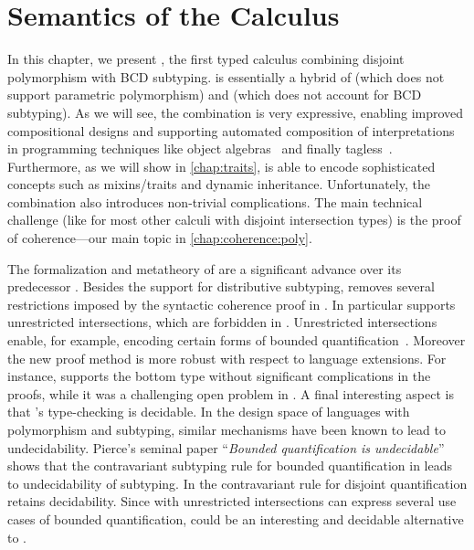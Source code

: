 
\chapter{Semantics of the \fnamee Calculus}
\label{chap:fi}

In this chapter, we present \fnamee, the first typed calculus combining disjoint
polymorphism with BCD subtyping. \fnamee is essentially a hybrid of \namee
(which does not support parametric polymorphism) and \fname (which does not
account for BCD subtyping). As we will see, the combination is very expressive,
enabling improved compositional designs and supporting automated composition of
interpretations in programming techniques like object
algebras~\citep{oliveira2012extensibility} and finally
tagless~\citep{CARETTE_2009}. Furthermore, as we will show in
\cref{chap:traits}, \fnamee is able to encode sophisticated concepts such as
mixins/traits and dynamic inheritance. Unfortunately, the combination also
introduces non-trivial complications. The main technical challenge (like for
most other calculi with disjoint intersection types) is the proof of
coherence---our main topic in \cref{chap:coherence:poly}.


The formalization and metatheory of \fnamee are a significant advance over its
predecessor \fname. Besides the support for distributive subtyping, \fnamee
removes several restrictions imposed by the syntactic coherence proof in \fname.
In particular \fnamee supports unrestricted intersections, which are forbidden
in \fname. Unrestricted intersections enable, for example, encoding certain
forms of bounded quantification~\citep{pierce1991programming}. Moreover the new
proof method is more robust with respect to language extensions. For instance,
\fnamee supports the bottom type without significant complications in the
proofs, while it was a challenging open problem in \fname. A final interesting
aspect is that \fnamee's type-checking is decidable. In the design space of
languages with polymorphism and subtyping, similar mechanisms have been known to
lead to undecidability. Pierce's seminal paper ``\emph{Bounded quantification is
  undecidable}''~\citep{pierce1994bounded} shows that the contravariant subtyping
rule for bounded quantification in \fsub leads to undecidability of subtyping.
In \fnamee the contravariant rule for disjoint quantification retains
decidability. Since with unrestricted intersections \fnamee can express several
use cases of bounded quantification, \fnamee could be an interesting and
decidable alternative to \fsub.








